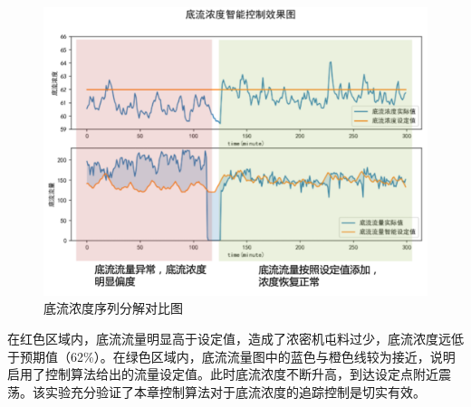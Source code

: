 \begin{figure}[ht]
  \centering
  \includegraphics[width=\linewidth]{figures/chapter6/actual.png}
  \caption{底流浓度序列分解对比图}
  \label{fig:actual}
\end{figure}
在红色区域内，底流流量明显高于设定值，造成了浓密机屯料过少，底流浓度远低于预期值（62\%）。在绿色区域内，底流流量图中的蓝色与橙色线较为接近，说明启用了控制算法给出的流量设定值。此时底流浓度不断升高，到达设定点附近震荡。该实验充分验证了本章控制算法对于底流浓度的追踪控制是切实有效。















